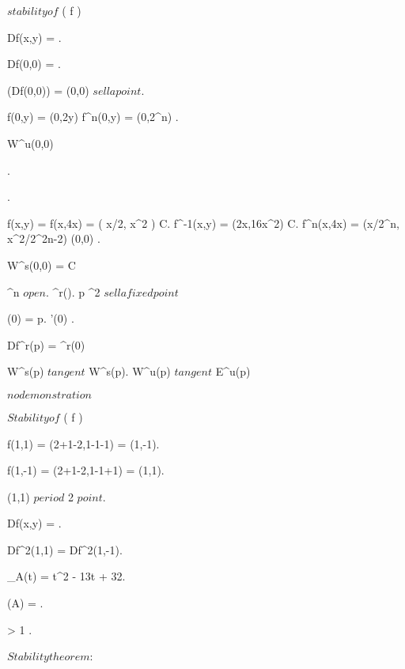 \documentclass[../Main/main]{subfiles}
\begin{document}
{	
	{
		{
		}
		\study
		{
			$stability of $ \fixed( f )
		}
		\start
		{
			Df(x,y) = .

			Df(0,0) = .

			\sigma(Df(0,0)) =  \imp (0,0) $ sella point $.

			{
				f(0,y) = (0,2y) \imp f^n(0,y) = (0,2^n) \convergesto \infty.

				 \subset W^u(0,0)
			}.

			.

			{
				f(x,y) = f(x,4x) = ( x/2, x^2 ) \in C.
				f^{-1}(x,y) = (2x,16x^2) \in C.
				f^n(x,4x) = (x/2^n, x^2/2^{2n-2}) \convergesto (0,0)
			}.

			W^s(0,0) = C
		}	
	}
	
	
	{
		{
			\Uc \subset \R^n $ open $.
			 \in \Cc^r(\Uc).
			p \in \R^2 $ sella fixed point $
		}
		\holds
		{
			{
				\gamma(0) = p.
				\gamma'(0) .

				{
					Df^r(p) = \gamma^r(0)
				}

				W^s(p) $ tangent $ W^s(p).
				W^u(p) $ tangent $ E^u(p)
			}
		}
		\demonstration
		{
			$ no demonstration $
		}
	}
	
	
	{
		{
		}
		\study
		{
			$Stability of $ \fixed( f )
		}
		\start
		{
			f(1,1) = (2+1-2,1-1-1) = (1,-1).

			f(1,-1) = (2+1-2,1-1+1) = (1,1).

			(1,1) $ period $ 2 $ point $.

			Df(x,y) = .

			Df^2(1,1) =  \neq Df^2(1,-1).

			\chi_A(t) = t^2 - 13t + 32.

			\sigma(A) = .

			{
				\abs{ \lambda } > 1
			}.

			$Stability theorem$:

}}}
\end{document}
